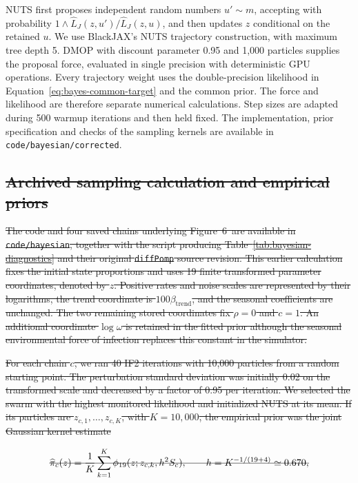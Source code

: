 \documentclass[11pt]{article}
\newcommand\refFigNutsEb{6} %
\theoremstyle{thmstylethree}%
\begin{document}
NUTS first proposes independent random numbers $u'\sim m$, accepting with
probability $1\wedge\widehat L_J(z,u')/\widehat L_J(z,u)$, and then updates
$z$ conditional on the retained $u$.
We use BlackJAX's NUTS trajectory construction, with maximum tree depth 5.
DMOP with discount parameter 0.95 and 1,000 particles supplies the proposal
force, evaluated in single precision with deterministic GPU operations.
Every trajectory weight uses the double-precision likelihood in
Equation~\ref{eq:bayes-common-target} and the common prior.
The force and likelihood are therefore separate numerical calculations.
Step sizes are adapted during 500 warmup iterations and then held fixed.
The implementation, prior specification and checks of the sampling kernels
are available in \texttt{code/bayesian/corrected}.

\subsection{\sout{Archived sampling calculation and empirical priors}}

\sout{The code and four saved chains underlying Figure~\refFigNutsEb\ are
available in \texttt{code/bayesian}, together with the script producing
Table~\mbox{\ref{tab:bayesian-diagnostics}} and their original \texttt{diffPomp}
source revision.
This earlier calculation fixes the initial state proportions and uses
19 finite transformed parameter coordinates, denoted by \mbox{$z$}.
Positive rates and noise scales are represented by their logarithms,
the trend coordinate is \mbox{$100\beta_{\mathrm{trend}}$}, and the seasonal
coefficients are unchanged. The two remaining stored coordinates fix
\mbox{$\rho=0$} and \mbox{$c=1$}. An additional coordinate \mbox{$\log\omega$} is retained
in the fitted prior although the seasonal environmental force of infection
replaces this constant in the simulator.}

\sout{For each chain \mbox{$c$}, we ran 40 IF2 iterations with 10,000 particles from
a random starting point. The perturbation standard deviation was initially
0.02 on the transformed scale and decreased by a factor of 0.95 per iteration.
We selected the swarm with the highest monitored likelihood and initialized
NUTS at its mean. If its particles are \mbox{$z_{c,1},\ldots,z_{c,K}$}, with
\mbox{$K=10,000$}, the empirical prior was the joint Gaussian kernel estimate}

\[\text{\sout{\mbox{$\displaystyle \widehat\pi_c(z)=\frac{1}{K}\sum_{k=1}^K
 \phi_{19}(z;z_{c,k},h^2 S_c),\qquad
 h=K^{-1/(19+4)}\simeq0.670,$}}}\]
\end{document}
